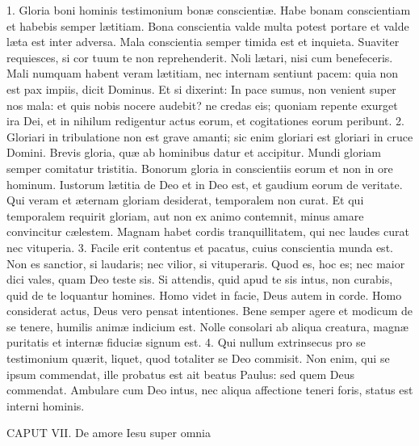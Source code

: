 \documentclass[twoside]{article}
\begin{document}
1. Gloria boni hominis testimonium bonæ conscientiæ. Habe bonam conscientiam et habebis semper lætitiam. Bona conscientia valde multa potest portare et valde læta est inter adversa. Mala conscientia semper timida est et inquieta. Suaviter requiesces, si cor tuum te non reprehenderit. Noli lætari, nisi cum benefeceris. Mali numquam habent veram lætitiam, nec internam sentiunt pacem: quia non est pax impiis, dicit Dominus. Et si dixerint: In pace sumus, non venient super nos mala: et quis nobis nocere audebit? ne credas eis; quoniam repente exurget ira Dei, et in nihilum redigentur actus eorum, et cogitationes eorum peribunt.
2. Gloriari in tribulatione non est grave amanti; sic enim gloriari est gloriari in cruce Domini. Brevis gloria, quæ ab hominibus datur et accipitur. Mundi gloriam semper comitatur tristitia. Bonorum gloria in conscientiis eorum et non in ore hominum. Iustorum lætitia de Deo et in Deo est, et gaudium eorum de veritate. Qui veram et æternam gloriam desiderat, temporalem non curat. Et qui temporalem requirit gloriam, aut non ex animo contemnit, minus amare convincitur cælestem. Magnam habet cordis tranquillitatem, qui nec laudes curat nec vituperia.
3. Facile erit contentus et pacatus, cuius conscientia munda est. Non es sanctior, si laudaris; nec vilior, si vituperaris. Quod es, hoc es; nec maior dici vales, quam Deo teste sis. Si attendis, quid apud te sis intus, non curabis, quid de te loquantur homines. Homo videt in facie, Deus autem in corde. Homo considerat actus, Deus vero pensat intentiones. Bene semper agere et modicum de se tenere, humilis animæ indicium est. Nolle consolari ab aliqua creatura, magnæ puritatis et internæ fiduciæ signum est.
4. Qui nullum extrinsecus pro se testimonium quærit, liquet, quod totaliter se Deo commisit. Non enim, qui se ipsum commendat, ille probatus est ait beatus Paulus: sed quem Deus commendat. Ambulare cum Deo intus, nec aliqua affectione teneri foris, status est interni hominis.


CAPUT VII.
De amore Iesu super omnia
\end{document}
